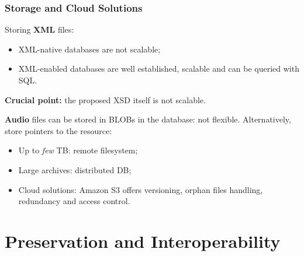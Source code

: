 \documentclass{beamer}
\newcommand\rb[1]{\textcolor{ThemeRed}{\textbf{#1}}}
\begin{document}
  \begin{frame}
    \frametitle{Storage and Cloud Solutions}

    Storing \rb{XML} files:

    \vspace{0.5em}

    \begin{itemize}
      \item XML-native databases are not scalable;
      \item XML-enabled databases are well established, scalable and can be queried with SQL.
    \end{itemize}

    \vspace{0.5em}

    \rb{Crucial point:} the proposed XSD itself is not scalable.

    \vspace{1em}

    \rb{Audio} files can be stored in BLOBs in the database: not flexible. Alternatively, store pointers to the resource:

    \vspace{0.5em}

    \begin{itemize}
      \item Up to \textit{few} TB: remote filesystem;
      \item Large archives: distributed DB;
      \item Cloud solutions: Amazon S3 offers versioning, orphan files handling, redundancy and access control.
    \end{itemize}

  \end{frame}



\section{Preservation and Interoperability}
\end{document}
